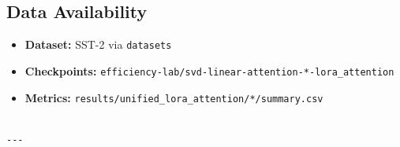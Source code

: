 \subsection{Data Availability}

\begin{itemize}
\item \textbf{Dataset:} SST-2 via \texttt{datasets}
\item \textbf{Checkpoints:} \texttt{efficiency-lab/svd-linear-attention-*-lora\_attention}
\item \textbf{Metrics:} \texttt{results/unified\_lora\_attention/*/summary.csv}
\end{itemize}
\begin{lstlisting}

---
\end{lstlisting}